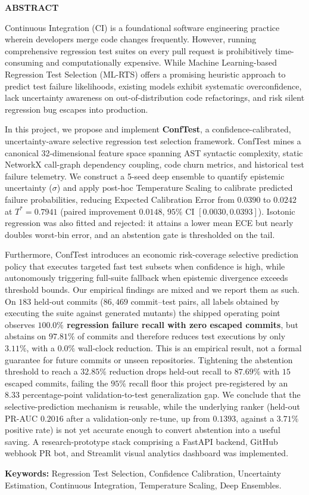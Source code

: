 \clearpage
\begin{center}
    {\Large \textbf{ABSTRACT}\par}
\end{center}
\vspace{1.0cm}

Continuous Integration (CI) is a foundational software engineering practice wherein developers merge code changes frequently. However, running comprehensive regression test suites on every pull request is prohibitively time-consuming and computationally expensive. While Machine Learning-based Regression Test Selection (ML-RTS) offers a promising heuristic approach to predict test failure likelihoods, existing models exhibit systematic overconfidence, lack uncertainty awareness on out-of-distribution code refactorings, and risk silent regression bug escapes into production.

In this project, we propose and implement \textbf{ConfTest}, a confidence-calibrated, uncertainty-aware selective regression test selection framework. ConfTest mines a canonical 32-dimensional feature space spanning AST syntactic complexity, static NetworkX call-graph dependency coupling, code churn metrics, and historical test failure telemetry. We construct a 5-seed deep ensemble to quantify epistemic uncertainty ($\sigma$) and apply post-hoc Temperature Scaling to calibrate predicted failure probabilities, reducing Expected Calibration Error from $0.0390$ to $0.0242$ at $T^* = 0.7941$ (paired improvement $0.0148$, $95\%$ CI $[0.0030, 0.0393]$). Isotonic regression was also fitted and rejected: it attains a lower mean ECE but nearly doubles worst-bin error, and an abstention gate is thresholded on the tail.

Furthermore, ConfTest introduces an economic risk-coverage selective prediction policy that executes targeted fast test subsets when confidence is high, while autonomously triggering full-suite fallback when epistemic divergence exceeds threshold bounds. Our empirical findings are mixed and we report them as such. On $183$ held-out commits ($86{,}469$ commit--test pairs, all labels obtained by executing the suite against generated mutants) the shipped operating point observes \textbf{$100.0\%$ regression failure recall with zero escaped commits}, but abstains on $97.81\%$ of commits and therefore reduces test executions by only $\mathbf{3.11\%}$, with a $\mathbf{0.0\%}$ wall-clock reduction. This is an empirical result, not a formal guarantee for future commits or unseen repositories. Tightening the abstention threshold to reach a $32.85\%$ reduction drops held-out recall to $87.69\%$ with $15$ escaped commits, failing the $95\%$ recall floor this project pre-registered by an $8.33$ percentage-point validation-to-test generalization gap. We conclude that the selective-prediction mechanism is reusable, while the underlying ranker (held-out PR-AUC $0.2016$ after a validation-only re-tune, up from $0.1393$, against a $3.71\%$ positive rate) is not yet accurate enough to convert abstention into a useful saving. A research-prototype stack comprising a FastAPI backend, GitHub webhook PR bot, and Streamlit visual analytics dashboard was implemented.

\vspace{0.5cm}
\noindent \textbf{Keywords:} Regression Test Selection, Confidence Calibration, Uncertainty Estimation, Continuous Integration, Temperature Scaling, Deep Ensembles.

\clearpage

